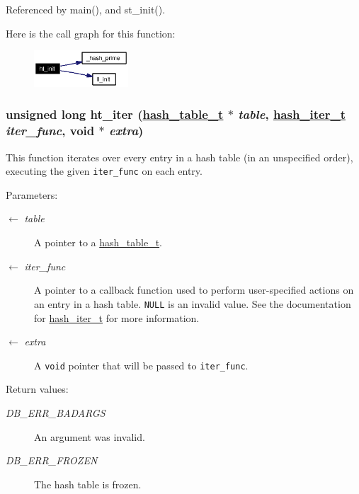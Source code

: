 Referenced by main(), and st\_\-init().

Here is the call graph for this function:\begin{figure}[H]
\begin{center}
\leavevmode
\includegraphics[width=100pt]{group__dbprim__hash_ga9_cgraph}
\end{center}
\end{figure}
\hypertarget{group__dbprim__hash_ga14}{
\subsubsection[ht\_\-iter]{\setlength{\rightskip}{0pt plus 5cm}unsigned long ht\_\-iter (\hyperlink{struct__hash__table__s}{hash\_\-table\_\-t} $\ast$ {\em table}, \hyperlink{group__dbprim__hash_ga3}{hash\_\-iter\_\-t} {\em iter\_\-func}, void $\ast$ {\em extra})}}
\label{group__dbprim__hash_ga14}


This function iterates over every entry in a hash table (in an unspecified order), executing the given {\tt iter\_\-func} on each entry.

\begin{Desc}
\item[Parameters:]
\begin{description}
\item[\mbox{$\leftarrow$} {\em table}]A pointer to a \hyperlink{group__dbprim__hash_ga1}{hash\_\-table\_\-t}. \item[\mbox{$\leftarrow$} {\em iter\_\-func}]A pointer to a callback function used to perform user-specified actions on an entry in a hash table. {\tt NULL} is an invalid value. See the documentation for \hyperlink{group__dbprim__hash_ga3}{hash\_\-iter\_\-t} for more information. \item[\mbox{$\leftarrow$} {\em extra}]A {\tt void} pointer that will be passed to {\tt iter\_\-func}.\end{description}
\end{Desc}
\begin{Desc}
\item[Return values:]
\begin{description}
\item[{\em DB\_\-ERR\_\-BADARGS}]An argument was invalid. \item[{\em DB\_\-ERR\_\-FROZEN}]The hash table is frozen.\end{description}
\end{Desc}


